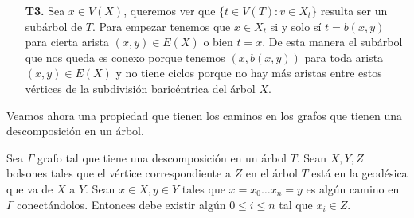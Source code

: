 \documentclass[tesis.tex]{subfiles}
\begin{document}
\begin{ej}
\begin{enumerate}
		\item[\textbf{T3.}] 
		Sea $x \in V(X)$, queremos ver que $\{ t \in V(T) :  v \in X_t \}$ resulta ser un subárbol de $T$.		
		Para empezar tenemos que $x \in X_t$ si y solo sí $t = b(x,y)$ para cierta arista $(x,y) \in E(X)$ o bien $t = x$.
		De esta manera el subárbol que nos queda es conexo porque tenemos $(x,b(x,y))$ para toda arista $(x,y) \in E(X)$ y no tiene ciclos porque no hay más aristas entre estos vértices de la subdivisión baricéntrica del árbol $X$.
%		
%		
	\end{enumerate}
\end{ej}



Veamos ahora una propiedad que tienen los caminos en los grafos que tienen una descomposición en un árbol.

\begin{prop}\label{prop-camino-desc}
	Sea $\Gamma$ grafo tal que tiene una descomposición en un árbol $T$.
	Sean $X,Y,Z$ bolsones tales que el vértice correspondiente a $Z$ en el árbol $T$ está en la geodésica que va de $X$ a $Y$. 
	Sean $x \in X, y \in Y$ tales que $x = x_0 \dots x_n=y$ es algún camino en $\Gamma$ conectándolos.
	Entonces debe existir algún $ 0 \le i \le n$ tal que $x_i \in Z$. 
\end{prop}
\end{document}
